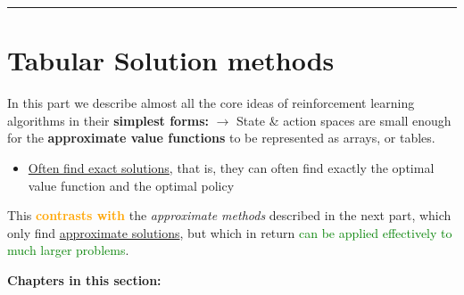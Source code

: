 \documentclass[12pt, a4paper]{article}
\begin{document}
\begin{center}\rule{0.5\linewidth}{0.5pt}\end{center}








\newpage
\part{Tabular Solution methods}\label{tabular-solution-methods}


In this part we describe almost all the core ideas of reinforcement
learning algorithms in their \textbf{simplest forms:} \(\rightarrow\)
State \& action spaces are small enough for the \textbf{approximate
value functions} to be represented as arrays, or tables.

\begin{itemize}
  \item \uline{Often find exact solutions}, that is, they can often find exactly the optimal value function and the optimal policy
\end{itemize}

This \textcolor{orange}{\textbf{contrasts with}} the \emph{approximate methods} described in the next part, which only find \uline{approximate solutions}, but which in return \textcolor{Green}{can be applied effectively to much larger problems}.

\textbf{Chapters in this section:}
\end{document}
